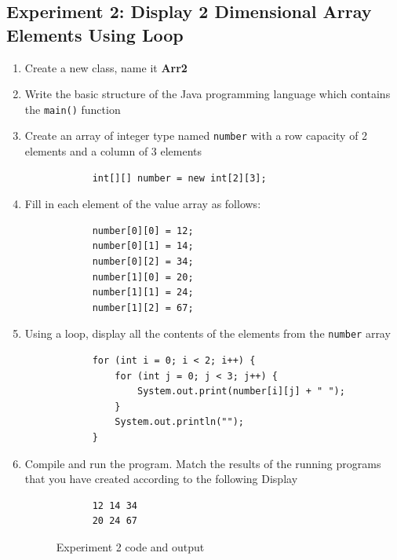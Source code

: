 \documentclass[12pt,titlepage]{article}
\begin{document}
\subsection{Experiment 2: Display 2 Dimensional Array Elements Using Loop}
\begin{enumerate}
    \item Create a new class, name it \textbf{Arr2}
    \item Write the basic structure of the Java programming language which contains the \texttt{main()} function
    \item {
        Create an array of integer type named \texttt{number} with a row capacity of 2 elements and a column of 3 elements
        
        \begin{verbatim}
            int[][] number = new int[2][3];
        \end{verbatim}
    }
    \item {
        Fill in each element of the value array as follows:

        \begin{verbatim}
            number[0][0] = 12;
            number[0][1] = 14;
            number[0][2] = 34;
            number[1][0] = 20;
            number[1][1] = 24;
            number[1][2] = 67;
        \end{verbatim}
    }
    \item {
        Using a loop, display all the contents of the elements from the \texttt{number} array

        \begin{verbatim}
            for (int i = 0; i < 2; i++) {
                for (int j = 0; j < 3; j++) {
                    System.out.print(number[i][j] + " ");
                }
                System.out.println("");
            }
        \end{verbatim}
    }
    \pagebreak
    \item {
        Compile and run the program. Match the results of the running programs that you have created according to the following Display

        \begin{verbatim}
            12 14 34
            20 24 67
        \end{verbatim}

        \begin{figure}[h]
            \centering
            \caption{Experiment 2 code and output}
        \end{figure}
    }
\end{enumerate}
\end{document}
